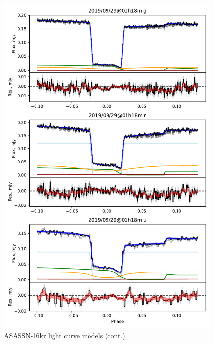 \begin{figure}
    \centering
    \includegraphics[width=\textwidth]{figures/results/three_cvs_with_weird_colours/ASASSN-16kr/ASASSN-16kr_6.pdf}
    \caption{ASASSN-16kr light curve models (cont.)}
    \label{fig:ASASSN-16kr all light curves cont 5}
\end{figure}

